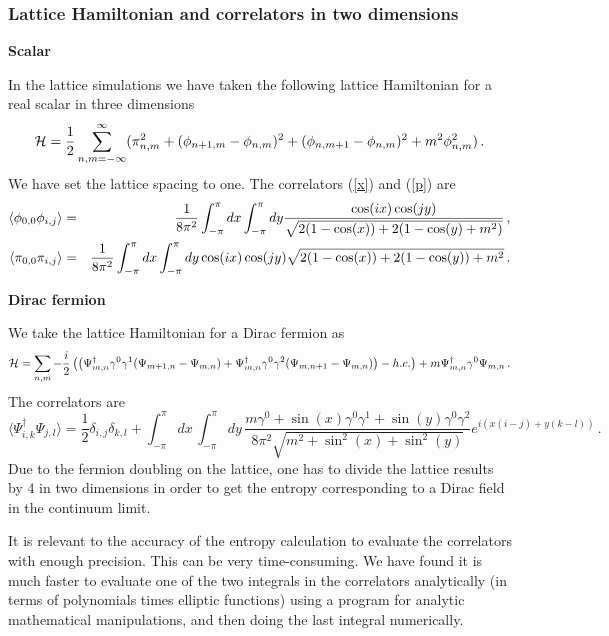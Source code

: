 \documentclass[a4paper]{article}
\begin{document}
\subsubsection{Lattice Hamiltonian and correlators in two  dimensions}

\noindent 
\textbf{Scalar}


\noindent In the lattice simulations we have taken the following lattice Hamiltonian for a real scalar in three dimensions   
\begin{equation}
{\cal H}=\frac{1}{2}\sum_{n,m=-\infty}^{\infty}( \pi _{n,m}^{2}+(\phi _{n+1,m}-\phi_{n,m})^{2}+(\phi _{n,m+1}-\phi_{n,m})^{2} +m^2 \phi _{n,m}^{2})\,.
\end{equation}
We have set the lattice spacing to one. 
The correlators (\ref{x}) and (\ref{p}) are  
\begin{eqnarray}
\langle \phi_{0,0}\phi_{i,j}\rangle &=&\frac{1}{8\pi^2}\int_{-\pi}^{\pi}dx \int_{-\pi}^{\pi}dy\frac{\cos(i x)\cos(j y)}{\sqrt{2
(1-\cos(x))+2
(1-\cos(y)+m^2)}}\,, \\
\langle \pi_{0,0}\pi_{i,j}\rangle &=& \frac{1}{8\pi^2}\int_{-\pi}^{\pi} dx\int_{-\pi}^{\pi}dy \cos(i x)\cos(j y)}{\sqrt{2
(1-\cos(x))+2
(1-\cos(y))+m^2}\,.
\end{eqnarray}

\noindent
\textbf{Dirac fermion}

\noindent We take the lattice Hamiltonian for a Dirac fermion as
\begin{equation}
{\cal H}=\sum_{n,m} -\frac{i}{2}\left(\left(\Psi^\dagger_{m,n} \gamma^0\gamma^1(\Psi_{m+1,n}-\Psi_{m,n})+\Psi^\dagger_{m,n} \gamma^0\gamma^2(\Psi_{m,n+1}-\Psi_{m,n})\right)-h.c.\right)+m  \Psi_{m,n}^\dagger\gamma^0 \Psi_{m,n}\,. 
\end{equation}
The correlators are
\begin{equation}
\langle \Psi^\dagger_{i,k}\Psi_{j,l}\rangle=\frac{1}{2}\delta_{i,j}\delta_{k,l}+\int_{-\pi}^\pi dx\, \int_{-\pi}^\pi dy\, \frac{m \gamma^0+\sin( x)\gamma^0 \gamma^1+\sin( y)\gamma^0\gamma^2}{8 \pi^2 \sqrt{m^2+\sin^2( x)+\sin^2( y)}} e^{ i (x (i-j)+y (k-l))}\,.
\end{equation}
Due to the fermion doubling on the lattice, one has to divide the lattice results by $4$ in two dimensions in order to get the entropy corresponding to a Dirac field in the continuum limit.  

\smallskip

\noindent
It is relevant to the accuracy of the entropy calculation to evaluate the correlators with enough precision. This can be very time-consuming. We have found it is much faster to evaluate one of the two integrals in the correlators analytically (in terms of polynomials times elliptic functions) using a program for analytic mathematical manipulations, and then doing the last integral numerically.
\end{document}
